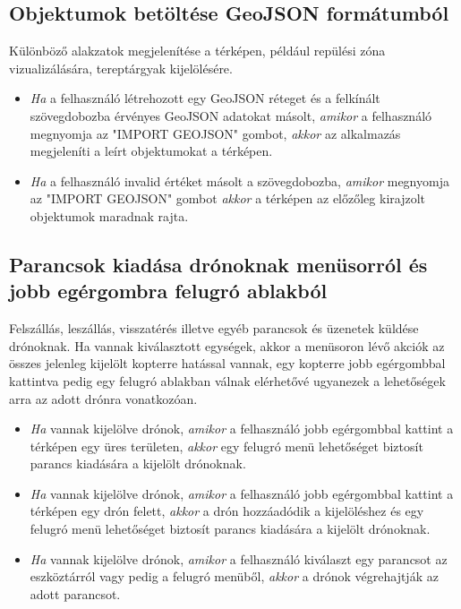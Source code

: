 \subsection{Objektumok betöltése GeoJSON formátumból}

Különböző alakzatok megjelenítése a térképen, például repülési zóna vizualizálására, tereptárgyak kijelölésére.

\begin {itemize}
  \item \textit{Ha} a felhasználó létrehozott egy GeoJSON réteget és a felkínált szövegdobozba érvényes GeoJSON adatokat másolt, \textit{amikor} a felhasználó megnyomja az "IMPORT GEOJSON" gombot, \textit{akkor} az alkalmazás megjeleníti a leírt objektumokat a térképen.
  \item \textit{Ha} a felhasználó invalid értéket másolt a szövegdobozba, \textit{amikor} megnyomja az "IMPORT GEOJSON" gombot \textit{akkor} a térképen az előzőleg kirajzolt objektumok maradnak rajta.
\end {itemize}


\subsection{Parancsok kiadása drónoknak menüsorról és jobb egérgombra felugró ablakból}

Felszállás, leszállás, visszatérés illetve egyéb parancsok és üzenetek küldése drónoknak. Ha vannak kiválasztott egységek, akkor a menüsoron lévő akciók az összes jelenleg kijelölt kopterre hatással vannak, egy kopterre jobb egérgombbal kattintva pedig egy felugró ablakban válnak elérhetővé ugyanezek a lehetőségek arra az adott drónra vonatkozóan.

\begin {itemize}
  \item \textit{Ha} vannak kijelölve drónok, \textit{amikor} a felhasználó jobb egérgombbal kattint a térképen egy üres területen, \textit{akkor} egy felugró menü lehetőséget biztosít parancs kiadására a kijelölt drónoknak.
  \item \textit{Ha} vannak kijelölve drónok, \textit{amikor} a felhasználó jobb egérgombbal kattint a térképen egy drón felett, \textit{akkor} a drón hozzáadódik a kijelöléshez és egy felugró menü lehetőséget biztosít parancs kiadására a kijelölt drónoknak.
  \item \textit{Ha} vannak kijelölve drónok, \textit{amikor} a felhasználó kiválaszt egy parancsot az eszköztárról vagy pedig a felugró menüből, \textit{akkor} a drónok végrehajtják az adott parancsot.
\end {itemize}


